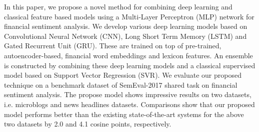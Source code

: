 In this paper, we propose a novel method for combining deep learning and classical feature based models using a Multi-Layer Perceptron (MLP) network for financial sentiment analysis. We develop various deep learning models based on Convolutional Neural Network (CNN), Long Short Term Memory (LSTM) and Gated Recurrent Unit (GRU). These are trained on top of pre-trained, autoencoder-based, financial word embeddings and lexicon features. An ensemble is constructed by combining these deep learning models and a classical supervised model based on Support Vector Regression (SVR). We evaluate our proposed technique on a benchmark dataset of SemEval-2017 shared task on financial sentiment analysis. The propose model shows impressive results on two datasets, i.e. microblogs and news headlines datasets. Comparisons show that our proposed model performs better than the existing state-of-the-art systems for the above two datasets by 2.0 and 4.1 cosine points, respectively.
